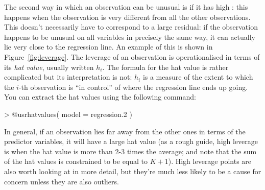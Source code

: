 The second way in which an observation can be unusual is if it has high : this happens when the observation is very different from all the other observations. This doesn't necessarily have to correspond to a large residual: if the observation happens to be unusual on all variables in precisely the same way, it can actually lie very close to the regression line. An example of this is shown in Figure~\ref{fig:leverage}. The leverage of an observation is operationalised in terms of its {\it hat value}, usually written $h_i$. The formula for the hat value is rather complicated but its interpretation is not: $h_i$ is a measure of the extent to which the $i$-th observation is ``in control'' of where the regression line ends up going. You can extract the hat values using the following command:
\begin{rblock1}
> @usr{hatvalues( model = regression.2 )}
\end{rblock1}
In general, if an observation lies far away from the other ones in terms of the predictor variables, it will have a large hat value (as a rough guide, high leverage is when the hat value is more than 2-3 times the average; and note that the sum of the hat values is constrained to be equal to $K+1$). High leverage points are also worth looking at in more detail, but they're much less likely to be a cause for concern unless they are also outliers.  %

